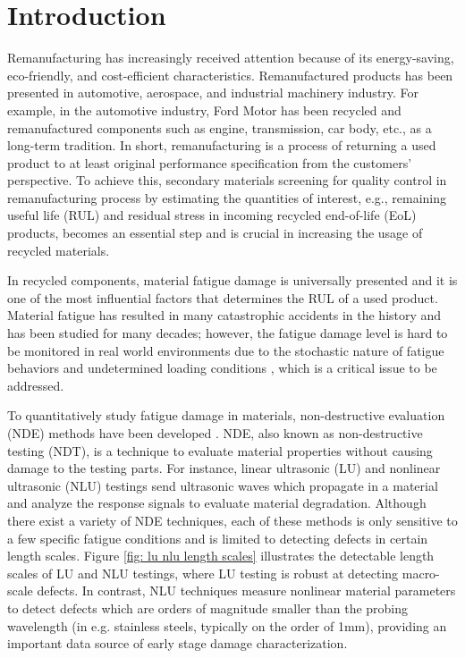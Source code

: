 \chapter{Introduction}
\label{chap: intro}
Remanufacturing has increasingly received attention because of its energy-saving, eco-friendly, and cost-efficient characteristics. Remanufactured products has been presented in automotive, aerospace, and industrial machinery industry. For example, in the automotive industry, Ford Motor has been recycled and remanufactured components such as engine, transmission, car body, etc., as a long-term tradition. In short, remanufacturing is a process of returning a used product to at least original performance specification from the customers’ perspective. To achieve this, secondary materials screening for quality control in remanufacturing process by estimating the quantities of interest, e.g., remaining useful life (RUL) and residual stress in incoming recycled end-of-life (EoL) products, becomes an essential step and is crucial in increasing the usage of recycled materials.

In recycled components, material fatigue damage is universally presented and it is one of the most influential factors that determines the RUL of a used product. Material fatigue has resulted in many catastrophic accidents in the history and has been studied for many decades; however, the fatigue damage level is hard to be monitored in real world environments due to the stochastic nature of fatigue behaviors and undetermined loading conditions \cite{fatigue-review-Santecchia2016}, which is a critical issue to be addressed.

To quantitatively study fatigue damage in materials, non-destructive evaluation (NDE) methods have been developed \cite{nde-review-WISNER2020}. NDE, also known as non-destructive testing (NDT), is a technique to evaluate material properties without causing damage to the testing parts. For instance, linear ultrasonic (LU) and nonlinear ultrasonic (NLU) testings send ultrasonic waves which propagate in a material and analyze the response signals to evaluate material degradation. Although there exist a variety of NDE techniques, each of these methods is only sensitive to a few specific fatigue conditions and is limited to detecting defects in certain length scales. Figure \ref{fig: lu nlu length scales} illustrates the detectable length scales of LU and NLU testings, where LU testing is robust at detecting macro-scale defects. In contrast, NLU techniques measure nonlinear material parameters to detect defects which are orders of magnitude smaller than the probing wavelength (in e.g. stainless steels, typically on the order of 1mm), providing an important data source of early stage damage characterization.

